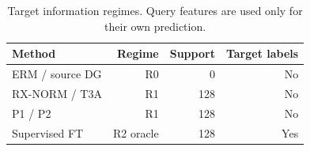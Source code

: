 \begin{table}[t]
\centering
\caption{Target information regimes. Query features are used only for their own prediction.}
\label{tab:info}
\small
\begin{tabular}{lrrr}
\toprule
Method & Regime & Support & Target labels\\
\midrule
ERM / source DG & R0 & 0 & No\\
RX-NORM / T3A & R1 & 128 & No\\
P1 / P2 & R1 & 128 & No\\
Supervised FT & R2 oracle & 128 & Yes\\
\bottomrule
\end{tabular}
\end{table}
